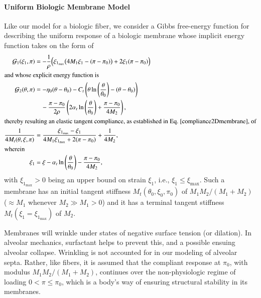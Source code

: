 \paragraph{Uniform Biologic Membrane Model}

Like our model for a biologic fiber, we consider a Gibbs free-energy function for describing the uniform response of a biologic membrane whose implicit energy function takes on the form of
\begin{subequations} 
    \label{uniformMembrane}
    \begin{align}
    \mathcal{G}_1 (\xi_1 , \pi) & = - \frac{1}{\rho} 
    \Bigl( \xi_{1_{\max}} \bigl( 4M_1 \xi_1 - (\pi - \pi_0) \bigr) + 2 \xi_1 (\pi - \pi_0) \Bigr) \\
    \intertext{and whose explicit energy function is}
    \mathcal{G}_2 (\theta , \pi) & = 
    -\eta_0 ( \theta - \theta_0 )
    -C_t \left( \theta \ln \left( \frac{\theta}{\theta_0} \right) -
    (\theta - \theta_0) \right) \notag \\ 
    \mbox{} & \quad - \frac{\pi - \pi_0}{2\rho} \left( 
    2 \alpha_t \ln \left( \frac{\theta}{\theta_0} \right) + \frac{\pi - \pi_0}{4M_2} \right) ,\\
    \intertext{thereby resulting an elastic tangent compliance, as established in Eq.~\ref{compliance2Dmembrane}, of}
    \frac{1}{4M_t(\theta, \xi, \pi)} & = 
    \frac{\xi_{1_{\max}} - \xi_1}
    {4M_1 \xi_{1_{\max}} + 2 (\pi - \pi_0)} + \frac{1}{4M_2} ,
    \label{membraneCompliance} \\
    \intertext{wherein} 
    \xi_1 & = \xi - 
    \alpha_t \ln \left( \frac{\theta}{\theta_0} \right) - 
    \frac{\pi - \pi_0}{4M_2} ,
    \end{align}
\end{subequations}
with $\xi_{1_{\max}} > 0$ being an upper bound on strain $\xi_1$, i.e., $\xi_1 \leq \xi_{{\max}}$.  Such a membrane has an initial tangent stiffness $M_t(\theta_0, \xi_0, \pi_0)$ of $M_1 M_2 / ( M_1 + M_2 )$ ($\approx M_1$ whenever $M_2 \gg M_1 > 0$) and it has a terminal tangent stiffness $M_t(\xi_1 \! = \! \xi_{1_{\max}})$ of $M_2$.

Membranes will wrinkle under states of negative surface tension (or dilation).  In alveolar mechanics, surfactant helps to prevent this, and a possible ensuing alveolar collapse.  Wrinkling is not accounted for in our modeling of alveolar septa.  Rather, like fibers, it is assumed that the compliant response at $\pi_0$, with modulus $M_1 M_2 / ( M_1 + M_2 )$, continues over the non-physiologic regime of loading $0 < \pi \leq \pi_0$, which is a body's way of ensuring structural stability in its membranes.

